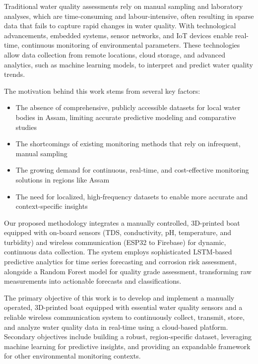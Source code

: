 \documentclass[conference]{IEEEtran}
\begin{document}
Traditional water quality assessments rely on manual sampling and laboratory analyses, which are time-consuming and labour-intensive, often resulting in sparse data that fails to capture rapid changes in water quality. With technological advancements, embedded systems, sensor networks, and IoT devices enable real-time, continuous monitoring of environmental parameters. These technologies allow data collection from remote locations, cloud storage, and advanced analytics, such as machine learning models, to interpret and predict water quality trends.

The motivation behind this work stems from several key factors:
\begin{itemize}
\item The absence of comprehensive, publicly accessible datasets for local water bodies in Assam, limiting accurate predictive modeling and comparative studies
\item The shortcomings of existing monitoring methods that rely on infrequent, manual sampling
\item The growing demand for continuous, real-time, and cost-effective monitoring solutions in regions like Assam
\item The need for localized, high-frequency datasets to enable more accurate and context-specific insights
\end{itemize}

Our proposed methodology integrates a manually controlled, 3D-printed boat equipped with on-board sensors (TDS, conductivity, pH, temperature, and turbidity) and wireless communication (ESP32 to Firebase) for dynamic, continuous data collection. The system employs sophisticated LSTM-based predictive analytics for time series forecasting and corrosion risk assessment, alongside a Random Forest model for quality grade assessment, transforming raw measurements into actionable forecasts and classifications.

The primary objective of this work is to develop and implement a manually operated, 3D-printed boat equipped with essential water quality sensors and a reliable wireless communication system to continuously collect, transmit, store, and analyze water quality data in real-time using a cloud-based platform. Secondary objectives include building a robust, region-specific dataset, leveraging machine learning for predictive insights, and providing an expandable framework for other environmental monitoring contexts.
\end{document}

